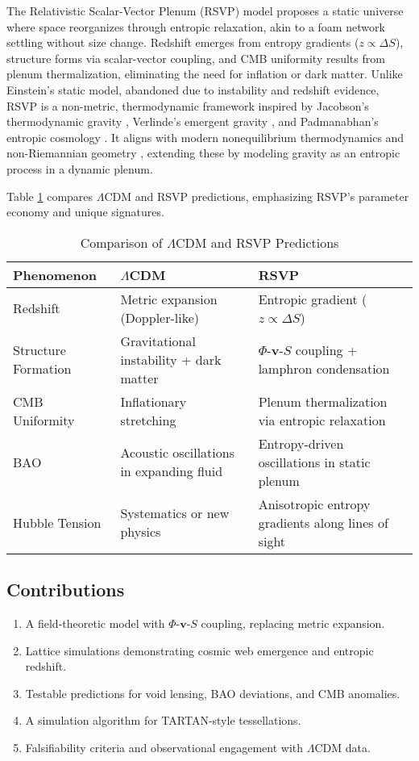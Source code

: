 \documentclass[11pt]{article}
\theoremstyle{plain}
\theoremstyle{definition}
\begin{document}
The Relativistic Scalar-Vector Plenum (RSVP) model proposes a static universe where space reorganizes through entropic relaxation, akin to a foam network settling without size change. Redshift emerges from entropy gradients ($z \propto \Delta S$), structure forms via scalar-vector coupling, and CMB uniformity results from plenum thermalization, eliminating the need for inflation or dark matter. Unlike Einstein’s static model, abandoned due to instability and redshift evidence, RSVP is a non-metric, thermodynamic framework inspired by Jacobson’s thermodynamic gravity \citep{Jacobson1995}, Verlinde’s emergent gravity \citep{Verlinde2011}, and Padmanabhan’s entropic cosmology \citep{Padmanabhan2015}. It aligns with modern nonequilibrium thermodynamics and non-Riemannian geometry \citep{Shao2023}, extending these by modeling gravity as an entropic process in a dynamic plenum.

Table \ref{tab:comparison} compares $\Lambda$CDM and RSVP predictions, emphasizing RSVP’s parameter economy and unique signatures.

\begin{table}[ht]
\centering
\caption{Comparison of $\Lambda$CDM and RSVP Predictions}
\label{tab:comparison}
\begin{tabular}{p{}p{}p{}}
\toprule
\textbf{Phenomenon} & \textbf{$\Lambda$CDM} & \textbf{RSVP} \\
\midrule
Redshift & Metric expansion (Doppler-like) & Entropic gradient ($z \propto \Delta S$) \\
Structure Formation & Gravitational instability + dark matter & $\Phi$-$\bm{v}$-$S$ coupling + lamphron condensation \\
CMB Uniformity & Inflationary stretching & Plenum thermalization via entropic relaxation \\
BAO & Acoustic oscillations in expanding fluid & Entropy-driven oscillations in static plenum \\
Hubble Tension & Systematics or new physics & Anisotropic entropy gradients along lines of sight \\
\bottomrule
\end{tabular}
\end{table}

\subsection{Contributions}
\begin{enumerate}
    \item A field-theoretic model with $\Phi$-$\bm{v}$-$S$ coupling, replacing metric expansion.
    \item Lattice simulations demonstrating cosmic web emergence and entropic redshift.
    \item Testable predictions for void lensing, BAO deviations, and CMB anomalies.
    \item A simulation algorithm for TARTAN-style tessellations.
    \item Falsifiability criteria and observational engagement with $\Lambda$CDM data.
\end{enumerate}
\end{document}
